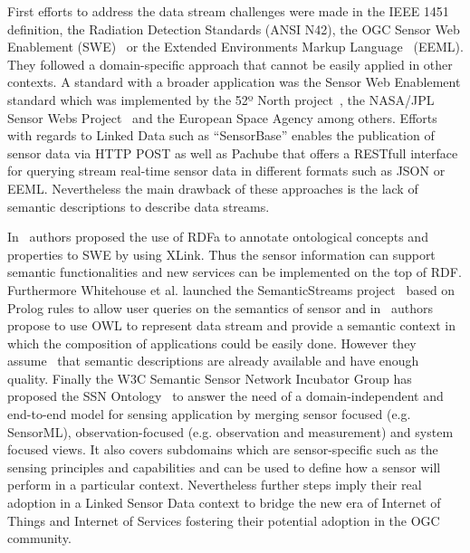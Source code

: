 First efforts to address the data stream challenges were made in the IEEE 1451 
definition, the Radiation Detection Standards (ANSI N42), the OGC Sensor Web 
Enablement (SWE)~\cite{sensorweb-wb} or the Extended Environments Markup Language~\cite{eeml} (EEML). 
They followed a domain-specific approach that cannot be easily applied in other 
contexts. A standard with a broader application was the Sensor Web Enablement 
standard which was implemented by the 52º North project~\cite{52project}, the NASA/JPL~\cite{nasajpl}
Sensor Webs Project~\cite{Sheth:2008:SSW:1444383.1444435} and the European Space Agency among others. 
Efforts with regards to Linked Data such as ``SensorBase'' enables the publication 
of sensor data via HTTP POST as well as Pachube that offers a RESTfull interface 
for querying stream real-time sensor data in different formats such as JSON or EEML. 
Nevertheless the main drawback of these approaches is the lack of semantic descriptions to describe data streams.


In~\cite{Sheth:2008:SSW:1444383.1444435} authors proposed the use of RDFa to annotate ontological concepts and 
properties to SWE by using XLink. Thus the sensor information can support 
semantic functionalities and new services can be implemented on the top of RDF. 
Furthermore Whitehouse et al. launched the SemanticStreams project~\cite{Whitehouse:2006:SSF:2180141.2180148} based on 
Prolog rules to allow user queries on the semantics of sensor and in~\cite{Bouillet:2007:SMU:1769087.176909} 
authors propose to use OWL to represent data stream and provide a semantic 
context in which the composition of applications could be easily done. However 
they assume~\cite{deri2010} that semantic descriptions are already available and have 
enough quality. Finally the W3C Semantic Sensor Network Incubator Group has 
proposed the SSN Ontology~\cite{Compton:2012:OPS:2400766.2401456} to answer the need of a domain-independent and 
end-to-end model for sensing application by merging sensor focused (e.g. SensorML), observation-focused (e.g. observation and measurement) and system 
focused views. It also covers subdomains which are sensor-specific such as the 
sensing principles and capabilities and can be used to define how a sensor will 
perform in a particular context. Nevertheless further steps imply their real 
adoption in a Linked Sensor Data context to bridge the new era of Internet of 
Things and Internet of Services fostering their potential adoption in the OGC 
community.

